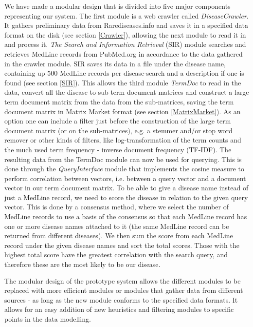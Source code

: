 We have made a modular design that is divided into five major
components representing our system. The first module is a web crawler
called \textit{DiseaseCrawler}. It gathers preliminary data from
Rarediseases.info and saves it in a specified data format on the disk
(see section \ref{Crawler}), allowing the next module to read it in
and process it. \textit{The Search and Information Retrieval} (SIR)
module searches and retrieves MedLine records from PubMed.org in
accordance to the data gathered in the crawler module. SIR saves its
data in a file under the disease name, containing up 500 MedLine
records per disease-search and a description if one is found (see
section \ref{SIR}). This allows the third module \textit{TermDoc} to
read in the data, convert all the disease to sub term document
matrices and construct a large term document matrix from the data from
the sub-matrices, saving the term document matrix in Matrix Market
format (see section \ref{MatrixMarket}). As an option one can include a filter
just before the construction of the large term document matrix (or on
the sub-matrices), e.g. a stemmer and/or stop word remover or other
kinds of filters, like log-transformation of the term counts and the
much used term frequency - inverse document frequency (TF-IDF). The
resulting data from the TermDoc module can now be used for
querying. This is done through the \textit{QueryInterface} module that
implements the cosine measure to perform correlation between vectors,
i.e. between a query vector and a document vector in our term document
matrix. To be able to give a disease name instead of just a MedLine
record, we need to score the disease in relation to the given query
vector. This is done by a consensus method, where we select the number
of MedLine records to use a basis of the consensus so that each
MedLine record has one or more disease names attached to it (the same
MedLine record can be returned from different diseases). We then sum
the score from each MedLine record under the given disease names
and sort the total scores. Those with the highest total score have the
greatest correlation with the search query, and therefore these are the
most likely to be our disease.

The modular design of the prototype system allows the different
modules to be replaced with more efficient modules or modules that
gather data from different sources - as long as the new module
conforms to the specified data formats. It allows for an easy addition
of new heuristics and filtering modules to specific points in the data
modelling.

